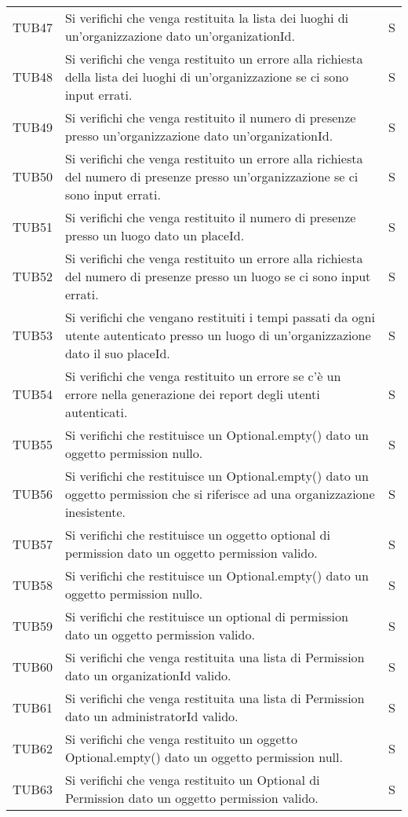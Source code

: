 {\begin{longtable}{ c C{13cm} C{1cm}}
TUB47 & Si verifichi che venga restituita la lista dei luoghi di un'organizzazione dato un'organizationId. & S \\
TUB48 & Si verifichi che venga restituito un errore alla richiesta della lista dei luoghi di un'organizzazione se ci sono input errati. & S \\
TUB49 & Si verifichi che venga restituito il numero di presenze presso un'organizzazione dato un'organizationId. & S \\
TUB50 & Si verifichi che venga restituito un errore alla richiesta del numero di presenze presso un'organizzazione se ci sono input errati. & S \\
TUB51 & Si verifichi che venga restituito il numero di presenze presso un luogo dato un placeId. & S \\
TUB52 & Si verifichi che venga restituito un errore alla richiesta del numero di presenze presso un luogo se ci sono input errati. & S \\
TUB53 & Si verifichi che vengano restituiti i tempi passati da ogni utente autenticato presso un luogo di un'organizzazione dato il suo placeId. & S \\
TUB54 & Si verifichi che venga restituito un errore se c'è un errore nella generazione dei report degli utenti autenticati. & S \\
TUB55 & Si verifichi che restituisce un Optional.empty() dato un oggetto permission nullo. & S \\
TUB56 & Si verifichi che restituisce un Optional.empty() dato un oggetto permission che si riferisce ad una organizzazione inesistente. & S \\
TUB57 & Si verifichi che restituisce un oggetto optional di permission dato un oggetto permission valido. & S \\
TUB58 & Si verifichi che restituisce un Optional.empty() dato un oggetto permission nullo. & S \\
TUB59 & Si verifichi che restituisce un optional di permission dato un oggetto permission valido. & S \\
TUB60 & Si verifichi che venga restituita una lista di Permission dato un organizationId valido. & S \\
TUB61 & Si verifichi che venga restituita una lista di Permission dato un administratorId valido. & S \\
TUB62 & Si verifichi che venga restituito un oggetto Optional.empty() dato un oggetto permission null. & S \\
TUB63 & Si verifichi che venga restituito un Optional di Permission dato un oggetto permission valido. & S \\

\end{longtable}}
